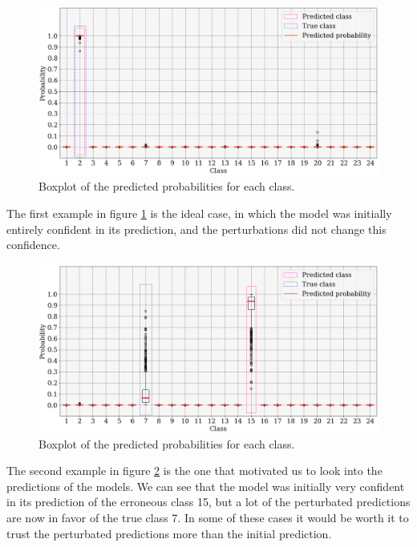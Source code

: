 \documentclass[switch, 11pt]{article}
\begin{document}
\begin{multicols}{2}
    \begin{figure}[H]
        \centering
        \includegraphics[width=\columnwidth]{figures/predictions_2.png}
        \caption{Boxplot of the predicted probabilities for each class.}
        \label{fig:predictions_2}
    \end{figure}
    The first example in figure \ref{fig:predictions_2} is the ideal case, in which the model was initially entirely confident in its prediction, and the perturbations did not change this confidence.
    \begin{figure}[H]
        \centering
        \includegraphics[width=\columnwidth]{figures/predictions_1.png}
        \caption{Boxplot of the predicted probabilities for each class.}
        \label{fig:predictions_1}
    \end{figure}
    The second example in figure \ref{fig:predictions_1} is the one that motivated us to look into the predictions of the models. We can see that the model was initially very confident in its prediction of the erroneous class 15, but a lot of the perturbated predictions are now in favor of the true class 7. In some of these cases it would be worth it to trust the perturbated predictions more than the initial prediction.
    \begin{figure}[H]

\end{figure}
\end{multicols}
\end{document}
